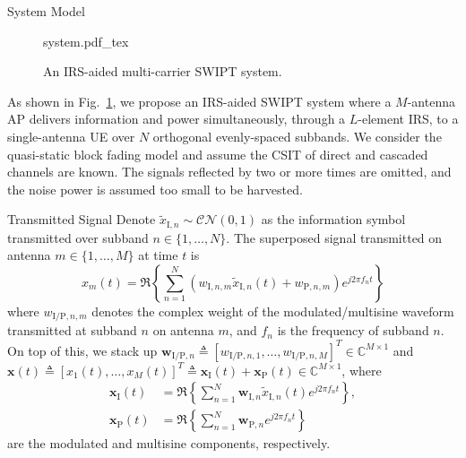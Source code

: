 \documentclass[journal]{IEEEtran}
\begin{document}
	\begin{section}{System Model}\label{se:system_model}
		\begin{figure}[!t]
			\centering
			\def\svgwidth{0.9\columnwidth}
			{system.pdf_tex}
			\caption{An IRS-aided multi-carrier SWIPT system.}
			\label{fi:system}
		\end{figure}

		As shown in Fig.~\ref{fi:system}, we propose an IRS-aided SWIPT system where a $M$-antenna AP delivers information and power simultaneously, through a $L$-element IRS, to a single-antenna UE over $N$ orthogonal evenly-spaced subbands. We consider the quasi-static block fading model and assume the CSIT of direct and cascaded channels are known. The signals reflected by two or more times are omitted, and the noise power is assumed too small to be harvested.


		\begin{subsection}{Transmitted Signal}
			Denote $\tilde{x}_{\mathrm{I},n}\sim\mathcal{CN}(0,1)$ as the information symbol transmitted over subband $n \in \{1, \dots, N\}$. The superposed signal transmitted on antenna $m \in \{1, \dots, M\}$ at time $t$ is
			\begin{equation}\label{eq:x_m}
				x_m(t)=\Re\left\{\sum_{n=1}^N\left({w_{\mathrm{I},n,m}\tilde{x}_{\mathrm{I},n}(t)}+w_{\mathrm{P},n,m}\right){e^{j2{\pi}{f_n}{t}}}\right\}
			\end{equation}
			where $w_{\mathrm{I/P},n,m}$ denotes the complex weight of the modulated/multisine waveform transmitted at subband $n$ on antenna $m$, and $f_n$ is the frequency of subband $n$. On top of this, we stack up $\boldsymbol{w}_{\mathrm{I/P},n} \triangleq [w_{\mathrm{I/P},n,1},\dots,w_{\mathrm{I/P},n,M}]^T \in \mathbb{C}^{M \times 1}$ and $\boldsymbol{x}(t) \triangleq [x_1(t),\dots,x_M(t)]^T \triangleq \boldsymbol{x}_{\mathrm{I}}(t)+\boldsymbol{x}_{\mathrm{P}}(t) \in \mathbb{C}^{M \times 1}$, where
			\begin{align}
				\boldsymbol{x}_{\mathrm{I}}(t) &= \Re{\left\{\sum_{n=1}^N\boldsymbol{w}_{\mathrm{I},n}\tilde{x}_{\mathrm{I},n}(t){e^{j2{\pi}{f_n}{t}}}\right\}},\label{eq:x_I}\\
				\boldsymbol{x}_{\mathrm{P}}(t) &= \Re{\left\{\sum_{n=1}^N\boldsymbol{w}_{\mathrm{P},n}{e^{j2{\pi}{f_n}{t}}}\right\}}\label{eq:x_P}
			\end{align}
			are the modulated and multisine components, respectively.
		\end{subsection}



\end{section}
\end{document}

